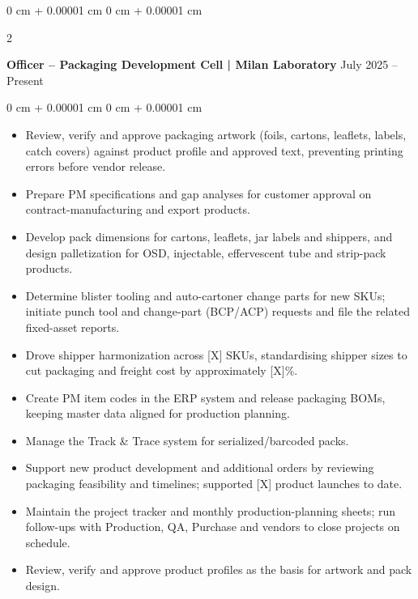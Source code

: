 \documentclass[10pt, letterpaper]{article}
\newenvironment{highlights}{
    \begin{itemize}[
        topsep=0.10 cm,
        parsep=0.10 cm,
        partopsep=0pt,
        itemsep=0pt,
        leftmargin=0 cm + 10pt
    ]
}{
    \end{itemize}
} %
\newenvironment{onecolentry}{
    \begin{adjustwidth}{
        0 cm + 0.00001 cm
    }{
        0 cm + 0.00001 cm
    }
}{
    \end{adjustwidth}
} %
\newenvironment{twocolentry}[2][]{
    \onecolentry
    \def\secondColumn{#2}
    \setcolumnwidth{\fill, 4.5 cm}
    \begin{paracol}{2}
}{
    \switchcolumn \raggedleft \secondColumn
    \end{paracol}
    \endonecolentry
} %
\begin{document}
        \begin{twocolentry}{
            July 2025 -- Present
        }
            \textbf{Officer -- Packaging Development Cell | Milan Laboratory}\end{twocolentry}
        \vspace{0.10 cm}
        \begin{onecolentry}
            \begin{highlights}
                \item Review, verify and approve packaging artwork (foils, cartons, leaflets, labels, catch covers) against product profile and approved text, preventing printing errors before vendor release.
                \item Prepare PM specifications and gap analyses for customer approval on contract-manufacturing and export products.
                \item Develop pack dimensions for cartons, leaflets, jar labels and shippers, and design palletization for OSD, injectable, effervescent tube and strip-pack products.
                \item Determine blister tooling and auto-cartoner change parts for new SKUs; initiate punch tool and change-part (BCP/ACP) requests and file the related fixed-asset reports.
                \item Drove shipper harmonization across [X] SKUs, standardising shipper sizes to cut packaging and freight cost by approximately [X]\%.
                \item Create PM item codes in the ERP system and release packaging BOMs, keeping master data aligned for production planning.
                \item Manage the Track \& Trace system for serialized/barcoded packs.
                \item Support new product development and additional orders by reviewing packaging feasibility and timelines; supported [X] product launches to date.
                \item Maintain the project tracker and monthly production-planning sheets; run follow-ups with Production, QA, Purchase and vendors to close projects on schedule.
                \item Review, verify and approve product profiles as the basis for artwork and pack design.
            \end{highlights}
        \end{onecolentry}
\end{document}
